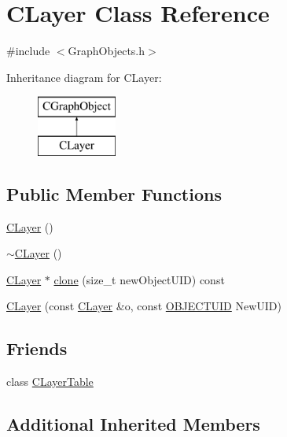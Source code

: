\hypertarget{class_c_layer}{}\section{C\+Layer Class Reference}
\label{class_c_layer}


{\ttfamily \#include $<$Graph\+Objects.\+h$>$}

Inheritance diagram for C\+Layer\+:\begin{figure}[H]
\begin{center}
\leavevmode
\includegraphics[height=2.000000cm]{class_c_layer}
\end{center}
\end{figure}
\subsection*{Public Member Functions}
\begin{DoxyCompactItemize}
\item 
\hyperlink{class_c_layer_a6156e0a33ab7511c751d8ddc8975c9a3}{C\+Layer} ()
\item 
\hyperlink{class_c_layer_a78d56eb9fffa4188383cdc0ca91ee67c}{$\sim$\+C\+Layer} ()
\item 
\hyperlink{class_c_layer}{C\+Layer} $\ast$ \hyperlink{class_c_layer_a82c9b165460376072885934c4da4e39f}{clone} (size\+\_\+t new\+Object\+U\+I\+D) const 
\item 
\hyperlink{class_c_layer_a1cd14982561b0fdcf919099df41b3efc}{C\+Layer} (const \hyperlink{class_c_layer}{C\+Layer} \&o, const \hyperlink{_object_database_defines_8h_a164ec120b01429b93c9cd0bef2a67e64}{O\+B\+J\+E\+C\+T\+U\+I\+D} New\+U\+I\+D)
\end{DoxyCompactItemize}
\subsection*{Friends}
\begin{DoxyCompactItemize}
\item 
class \hyperlink{class_c_layer_acc9f3446da3623694f17d73565a728db}{C\+Layer\+Table}
\end{DoxyCompactItemize}
\subsection*{Additional Inherited Members}


